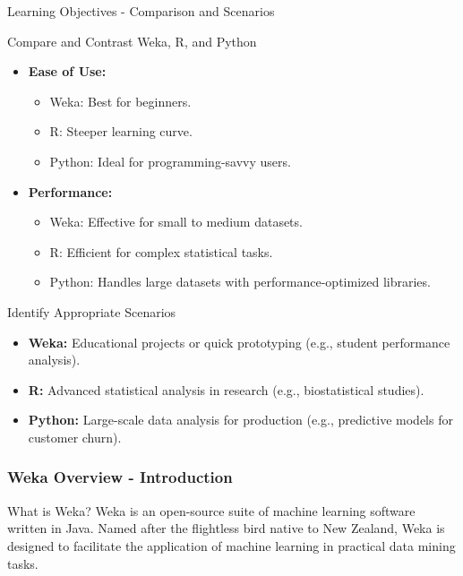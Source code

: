 \documentclass[aspectratio=169]{beamer}
\begin{document}
\begin{frame}[fragile]{Learning Objectives - Comparison and Scenarios}
    \begin{block}{Compare and Contrast Weka, R, and Python}
        \begin{itemize}
            \item \textbf{Ease of Use:}
                \begin{itemize}
                    \item Weka: Best for beginners.
                    \item R: Steeper learning curve.
                    \item Python: Ideal for programming-savvy users.
                \end{itemize}
            \item \textbf{Performance:}
                \begin{itemize}
                    \item Weka: Effective for small to medium datasets.
                    \item R: Efficient for complex statistical tasks.
                    \item Python: Handles large datasets with performance-optimized libraries.
                \end{itemize}
        \end{itemize}
    \end{block}

    \begin{block}{Identify Appropriate Scenarios}
        \begin{itemize}
            \item \textbf{Weka:} Educational projects or quick prototyping (e.g., student performance analysis).
            \item \textbf{R:} Advanced statistical analysis in research (e.g., biostatistical studies).
            \item \textbf{Python:} Large-scale data analysis for production (e.g., predictive models for customer churn).
        \end{itemize}
    \end{block}
\end{frame}

\begin{frame}[fragile]
    \frametitle{Weka Overview - Introduction}
    \begin{block}{What is Weka?}
        Weka is an open-source suite of machine learning software written in Java. 
        Named after the flightless bird native to New Zealand, Weka is designed to facilitate 
        the application of machine learning in practical data mining tasks.
    \end{block}
\end{frame}
\end{document}
